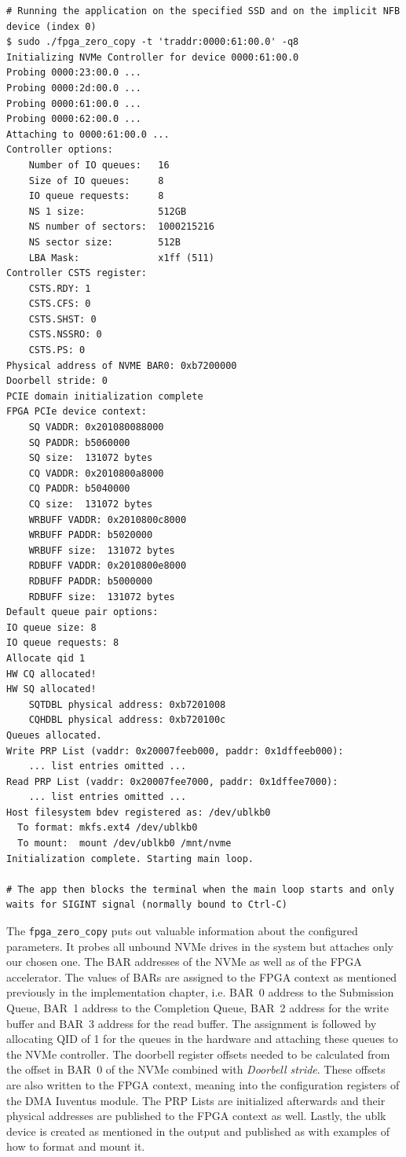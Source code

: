 \begin{lstlisting}[caption={Executing the SPDK application}]
# Running the application on the specified SSD and on the implicit NFB device (index 0)
$ sudo ./fpga_zero_copy -t 'traddr:0000:61:00.0' -q8
Initializing NVMe Controller for device 0000:61:00.0
Probing 0000:23:00.0 ...
Probing 0000:2d:00.0 ...
Probing 0000:61:00.0 ...
Probing 0000:62:00.0 ...
Attaching to 0000:61:00.0 ...
Controller options:
	Number of IO queues:   16
	Size of IO queues:     8
	IO queue requests:     8
	NS 1 size:             512GB
	NS number of sectors:  1000215216
	NS sector size:        512B
	LBA Mask:              x1ff (511)
Controller CSTS register:
	CSTS.RDY: 1
	CSTS.CFS: 0
	CSTS.SHST: 0
	CSTS.NSSRO: 0
	CSTS.PS: 0
Physical address of NVME BAR0: 0xb7200000
Doorbell stride: 0
PCIE domain initialization complete
FPGA PCIe device context:
	SQ VADDR: 0x201080088000
	SQ PADDR: b5060000
	SQ size:  131072 bytes
	CQ VADDR: 0x2010800a8000
	CQ PADDR: b5040000
	CQ size:  131072 bytes
	WRBUFF VADDR: 0x2010800c8000
	WRBUFF PADDR: b5020000
	WRBUFF size:  131072 bytes
	RDBUFF VADDR: 0x2010800e8000
	RDBUFF PADDR: b5000000
	RDBUFF size:  131072 bytes
Default queue pair options:
IO queue size: 8
IO queue requests: 8
Allocate qid 1
HW CQ allocated!
HW SQ allocated!
	SQTDBL physical address: 0xb7201008
	CQHDBL physical address: 0xb720100c
Queues allocated.
Write PRP List (vaddr: 0x20007feeb000, paddr: 0x1dffeeb000):
    ... list entries omitted ...
Read PRP List (vaddr: 0x20007fee7000, paddr: 0x1dffee7000):
    ... list entries omitted ...
Host filesystem bdev registered as: /dev/ublkb0
  To format: mkfs.ext4 /dev/ublkb0
  To mount:  mount /dev/ublkb0 /mnt/nvme
Initialization complete. Starting main loop.

# The app then blocks the terminal when the main loop starts and only waits for SIGINT signal (normally bound to Ctrl-C)
\end{lstlisting}

The \verb|fpga_zero_copy| puts out valuable information about the configured parameters. It probes
all unbound NVMe drives in the system but attaches only our chosen one. The BAR addresses of the
NVMe as well as of the FPGA accelerator. The values of BARs are assigned to the FPGA context as
mentioned previously in the implementation chapter, i.e. BAR~0 address to the Submission Queue,
BAR~1 address to the Completion Queue, BAR~2 address for the write buffer and BAR~3 address for the
read buffer. The assignment is followed by allocating \ac{QID} of 1 for the queues in the hardware
and attaching these queues to the NVMe controller. The doorbell register offsets needed to be
calculated from the offset in BAR~0 of the NVMe combined with \emph{Doorbell stride}. These offsets
are also written to the FPGA context, meaning into the configuration registers of the DMA Iuventus
module. The PRP Lists are initialized afterwards and their physical addresses are published to the
FPGA context as well. Lastly, the ublk device is created as mentioned in the output and published as
 with examples of how to format and mount it.

